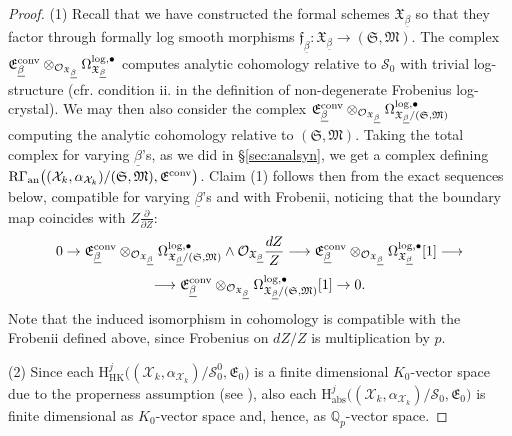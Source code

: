 \documentclass[asterisque,english]{smfart}
\begin{document}
\begin{proof}
(1) Recall that we have constructed the formal schemes $\mathfrak{X}_{\underline{\beta}}$ so that they factor through formally log smooth morphisms $\mathfrak{f}_{\underline{\beta}}\colon \mathfrak{X}_{\underline{\beta}} \to (\mathfrak{S},\mathfrak{M})$.  The complex $\mathfrak{E}^{\rm conv}_{\underline{\beta}}\otimes_{\mathcal{O}_{\mathfrak{X}_{\underline{\beta}}}} \Omega^{\log,\bullet}_{\mathfrak{X}_{\underline{\beta}}}$ computes analytic cohomology relative to $\mathcal{S}_0$ with trivial log-structure (cfr. condition ii. in the definition of non-degenerate Frobenius log-crystal). We may then also consider  the complex $\mathfrak{E}^{\rm conv}_{\underline{\beta}}\otimes_{\mathcal{O}_{\mathfrak{X}_{\underline{\beta}}}} \Omega^{\log,\bullet}_{\mathfrak{X}_{\underline{\beta}}/(\mathfrak{S},\mathfrak{M})}$ computing the analytic cohomology relative to  $(\mathfrak{S},\mathfrak{M})$.   Taking the total complex for varying $\underline{\beta}$'s, as we did in \S \ref{sec:analsyn}, we get a complex defining $ \mathrm{R}\Gamma_{\mathrm{an}}\bigl((\mathcal{X}_k,\alpha_{\mathcal{X}_k})/(\mathfrak{S},\mathfrak{M}),\mathfrak{E}^{\rm conv}\bigr)$.
Claim (1) follows then  from  the exact sequences below, compatible for varying $\underline{\beta}$'s and with Frobenii, noticing that the boundary map coincides with $Z \frac{\partial}{\partial Z}$:
$$0\to \mathfrak{E}^{\rm conv}_{\underline{\beta}}\otimes_{\mathcal{O}_{\mathfrak{X}_{\underline{\beta}}}}  \Omega_{\mathfrak{X}_{\underline{\beta}}/(\mathfrak{S},\mathfrak{M})}^{\log,\bullet}\wedge \mathcal{O}_{\mathfrak{X}_{\underline{\beta}}}\frac{dZ}{Z}\longrightarrow \mathfrak{E}^{\rm conv}_{\underline{\beta}}\otimes_{\mathcal{O}_{\mathfrak{X}_{\underline{\beta}}}}  \Omega^{\log,\bullet}_{\mathfrak{X}_{\underline{\beta}}}[1]  \longrightarrow $$ $$\longrightarrow \mathfrak{E}^{\rm conv}_{\underline{\beta}}\otimes_{\mathcal{O}_{\mathfrak{X}_{\underline{\beta}}}}  \Omega^{\log,\bullet}_{\mathfrak{X}_{\underline{\beta}}/(\mathfrak{S},\mathfrak{M})}[1]\to 0.$$Note that the induced isomorphism in cohomology is compatible with the Frobenii defined above, since Frobenius on $dZ/Z$ is multiplication by $p$.


(2) Since each $\mathrm{H}^{j}_{\mathrm{HK}}\bigl((\mathcal{X}_k,\alpha_{\mathcal{X}_k})/ \mathcal{S}_0^0,\mathfrak{E}_0\bigr)$ is a finite dimensional $K_0$-vector space due to the properness assumption (see \cite[\S 7]{BerthelotOgusBook}), also each $\mathrm{H}^j_{\mathrm{abs}}\bigl((\mathcal{X}_k,\alpha_{\mathcal{X}_k})/\mathcal{S}_0,\mathfrak{E}_0\bigr)$ is finite dimensional as $K_0$-vector space and, hence, as $\mathbb{Q}_p$-vector space.


\end{proof}
\end{document}
